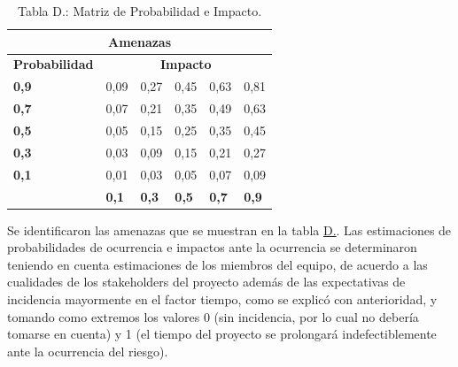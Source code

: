 \documentclass[a4paper, 12pt,twoside]{report}  %
\numberwithin{equation}{subsection} %
\begin{document}
\edef\tempTblMatProbImp{\the\value{counter_tbl_D}}%
\begin{table}[h!]
	\centering
	\begin{tabular}{
			|p{2.6cm}|p{2cm}|p{2cm}|p{2cm}|p{2cm}|p{2cm}|  }
		
		\hline
		\multicolumn{6}{|c|}{\textbf{Amenazas}} \\
		\hline
		\textbf{Probabilidad}&
		\multicolumn{5}{|c|}{\textbf{Impacto}} \\
		\hline
		\textbf{0,9}& \cellcolor{riesgo_bajo}0,09& \cellcolor{riesgo_alto}0,27& \cellcolor{riesgo_alto}0,45& \cellcolor{riesgo_alto}0,63& \cellcolor{riesgo_alto}0,81 \\
		\hline
		\textbf{0,7}& \cellcolor{riesgo_bajo}0,07& \cellcolor{riesgo_medio}0,21& \cellcolor{riesgo_alto}0,35& \cellcolor{riesgo_alto}0,49& \cellcolor{riesgo_alto}0,63 \\
		\hline
		\textbf{0,5}& \cellcolor{riesgo_bajo}0,05& \cellcolor{riesgo_medio}0,15& \cellcolor{riesgo_alto}0,25& \cellcolor{riesgo_alto}0,35& \cellcolor{riesgo_alto}0,45 \\
		\hline
		\textbf{0,3}& \cellcolor{riesgo_bajo}0,03& \cellcolor{riesgo_bajo}0,09& \cellcolor{riesgo_medio}0,15& \cellcolor{riesgo_medio}0,21& \cellcolor{riesgo_alto}0,27 \\
		\hline
		\textbf{0,1}& \cellcolor{riesgo_bajo}0,01& \cellcolor{riesgo_bajo}0,03& \cellcolor{riesgo_bajo}0,05& \cellcolor{riesgo_bajo}0,07& \cellcolor{riesgo_bajo}0,09 \\
		\hline
		\textbf{}& \textbf{0,1}& \textbf{0,3}& \textbf{0,5}& \textbf{0,7}& \textbf{0,9} \\
		\hline
	\end{tabular}
	\caption*{Tabla D.: Matriz de Probabilidad e Impacto.}
	\label{tabla_matriz_prob_impacto}
\end{table}

\indent Se identificaron las amenazas que se muestran en la tabla \hyperref[tabla_riesgos]{D.}. Las estimaciones de probabilidades de ocurrencia e impactos ante la ocurrencia se determinaron teniendo en cuenta estimaciones de los miembros del equipo, de acuerdo a las cualidades de los stakeholders del proyecto además de las expectativas de incidencia mayormente en el factor tiempo, como se explicó con anterioridad, y tomando como extremos los valores 0 (sin incidencia, por lo cual no debería tomarse en cuenta) y 1 (el tiempo del proyecto se prolongará indefectiblemente ante la ocurrencia del riesgo).\\
\end{document}
